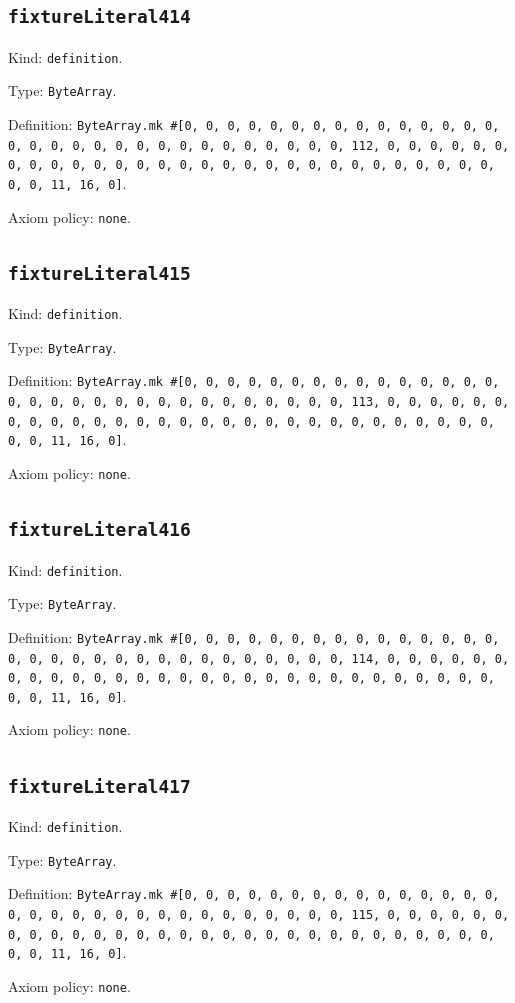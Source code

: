 \documentclass[11pt]{article}
\begin{document}
\subsection*{\texttt{fixtureLiteral414}}
\noindent Kind: \texttt{definition}.\par
\noindent Type: \texttt{ByteArray}.\par
\noindent Definition: \texttt{ByteArray.mk \#[0, 0, 0, 0, 0, 0, 0, 0, 0, 0, 0, 0, 0, 0, 0, 0, 0, 0, 0, 0, 0, 0, 0, 0, 0, 0, 0, 0, 0, 0, 0, 112, 0, 0, 0, 0, 0, 0, 0, 0, 0, 0, 0, 0, 0, 0, 0, 0, 0, 0, 0, 0, 0, 0, 0, 0, 0, 0, 0, 0, 0, 0, 0, 11, 16, 0]}.\par
\noindent Axiom policy: \texttt{none}.\par
\subsection*{\texttt{fixtureLiteral415}}
\noindent Kind: \texttt{definition}.\par
\noindent Type: \texttt{ByteArray}.\par
\noindent Definition: \texttt{ByteArray.mk \#[0, 0, 0, 0, 0, 0, 0, 0, 0, 0, 0, 0, 0, 0, 0, 0, 0, 0, 0, 0, 0, 0, 0, 0, 0, 0, 0, 0, 0, 0, 0, 113, 0, 0, 0, 0, 0, 0, 0, 0, 0, 0, 0, 0, 0, 0, 0, 0, 0, 0, 0, 0, 0, 0, 0, 0, 0, 0, 0, 0, 0, 0, 0, 11, 16, 0]}.\par
\noindent Axiom policy: \texttt{none}.\par
\subsection*{\texttt{fixtureLiteral416}}
\noindent Kind: \texttt{definition}.\par
\noindent Type: \texttt{ByteArray}.\par
\noindent Definition: \texttt{ByteArray.mk \#[0, 0, 0, 0, 0, 0, 0, 0, 0, 0, 0, 0, 0, 0, 0, 0, 0, 0, 0, 0, 0, 0, 0, 0, 0, 0, 0, 0, 0, 0, 0, 114, 0, 0, 0, 0, 0, 0, 0, 0, 0, 0, 0, 0, 0, 0, 0, 0, 0, 0, 0, 0, 0, 0, 0, 0, 0, 0, 0, 0, 0, 0, 0, 11, 16, 0]}.\par
\noindent Axiom policy: \texttt{none}.\par
\subsection*{\texttt{fixtureLiteral417}}
\noindent Kind: \texttt{definition}.\par
\noindent Type: \texttt{ByteArray}.\par
\noindent Definition: \texttt{ByteArray.mk \#[0, 0, 0, 0, 0, 0, 0, 0, 0, 0, 0, 0, 0, 0, 0, 0, 0, 0, 0, 0, 0, 0, 0, 0, 0, 0, 0, 0, 0, 0, 0, 115, 0, 0, 0, 0, 0, 0, 0, 0, 0, 0, 0, 0, 0, 0, 0, 0, 0, 0, 0, 0, 0, 0, 0, 0, 0, 0, 0, 0, 0, 0, 0, 11, 16, 0]}.\par
\noindent Axiom policy: \texttt{none}.\par
\end{document}
